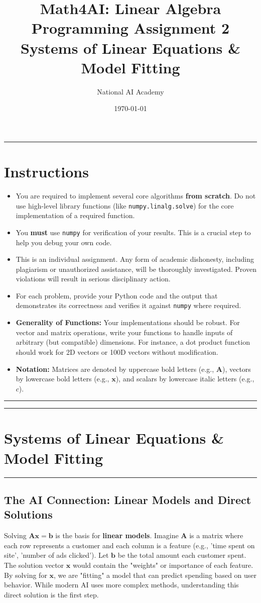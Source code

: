 \documentclass[12pt]{article}
\title{\textbf{Math4AI: Linear Algebra \\ Programming Assignment 2} \\ \large \vspace{5 mm}Systems of Linear Equations \& Model Fitting}
\author{National AI Academy}
\date{\today}
\begin{document}
\maketitle
\hrule

\section*{Instructions}

\begin{itemize}
    \item You are required to implement several core algorithms \textbf{from scratch}. Do not use high-level library functions (like \texttt{numpy.linalg.solve}) for the core implementation of a required function.
    \item You \textbf{must} use \texttt{numpy} for verification of your results. This is a crucial step to help you debug your own code.
    \item  This is an individual assignment. Any form of academic dishonesty, including plagiarism or unauthorized assistance, will be thoroughly investigated. Proven violations will result in serious disciplinary action.
    \item For each problem, provide your Python code and the output that demonstrates its correctness and verifies it against \texttt{numpy} where required.
    \item \textbf{Generality of Functions:} Your implementations should be robust. For vector and matrix operations, write your functions to handle inputs of arbitrary (but compatible) dimensions. For instance, a dot product function should work for 2D vectors or 100D vectors without modification.
    \item \textbf{Notation:} Matrices are denoted by uppercase bold letters (e.g., $\mathbf{A}$), vectors by lowercase bold letters (e.g., $\mathbf{x}$), and scalars by lowercase italic letters (e.g., $c$).
\end{itemize}

\hrule\vspace{1em}

\newpage
\hrule
\section*{Systems of Linear Equations \& Model Fitting}
\hrule\vspace{0.5em}

\subsection*{The AI Connection: Linear Models and Direct Solutions}
Solving $\mathbf{A}\mathbf{x} = \mathbf{b}$ is the basis for \textbf{linear models}. Imagine $\mathbf{A}$ is a matrix where each row represents a customer and each column is a feature (e.g., 'time spent on site', 'number of ads clicked'). Let $\mathbf{b}$ be the total amount each customer spent. The solution vector $\mathbf{x}$ would contain the "weights" or importance of each feature. By solving for $\mathbf{x}$, we are "fitting" a model that can predict spending based on user behavior. While modern AI uses more complex methods, understanding this direct solution is the first step.
\end{document}
